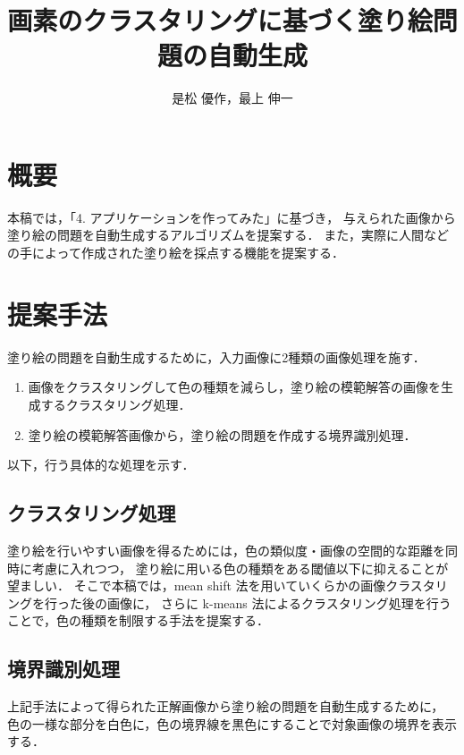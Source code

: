 \documentclass[dvipdfmx]{jsarticle}
\begin{document}
\title{画素のクラスタリングに基づく塗り絵問題の自動生成}
\author{是松 優作，最上 伸一}

\setlength{\baselineskip}{4.4mm}	%
\maketitle
\thispagestyle{empty}
\pagestyle{empty}

\section{概要}
本稿では，「4. アプリケーションを作ってみた」に基づき，
与えられた画像から塗り絵の問題を自動生成するアルゴリズムを提案する．
また，実際に人間などの手によって作成された塗り絵を採点する機能を提案する．

\section{提案手法}

塗り絵の問題を自動生成するために，入力画像に2種類の画像処理を施す．
\begin{enumerate}
\item 画像をクラスタリングして色の種類を減らし，塗り絵の模範解答の画像を生成する{\gtfamily クラスタリング処理}．
\item 塗り絵の模範解答画像から，塗り絵の問題を作成する{\gtfamily 境界識別処理}．
\end{enumerate}
以下，行う具体的な処理を示す．

\subsection{クラスタリング処理}
塗り絵を行いやすい画像を得るためには，色の類似度・画像の空間的な距離を同時に考慮に入れつつ，
塗り絵に用いる色の種類をある閾値以下に抑えることが望ましい．
そこで本稿では，mean shift 法を用いていくらかの画像クラスタリングを行った後の画像に，
さらに k-means 法によるクラスタリング処理を行うことで，色の種類を制限する手法を提案する．


\subsection{境界識別処理}
上記手法によって得られた正解画像から塗り絵の問題を自動生成するために，
色の一様な部分を白色に，色の境界線を黒色にすることで対象画像の境界を表示する．
\end{document}
